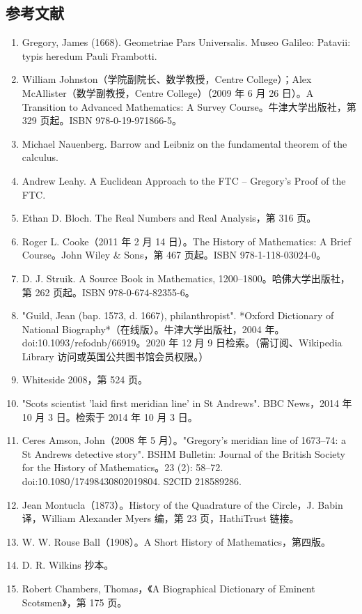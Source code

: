 \subsection{参考文献}
\begin{enumerate}
\item Gregory, James (1668). Geometriae Pars Universalis. Museo Galileo: Patavii: typis heredum Pauli Frambotti.
\item William Johnston（学院副院长、数学教授，Centre College）；Alex McAllister（数学副教授，Centre College）（2009 年 6 月 26 日）。A Transition to Advanced Mathematics: A Survey Course。牛津大学出版社，第 329 页起。ISBN 978-0-19-971866-5。
\item Michael Nauenberg. Barrow and Leibniz on the fundamental theorem of the calculus.
\item Andrew Leahy. A Euclidean Approach to the FTC – Gregory's Proof of the FTC.
\item Ethan D. Bloch. The Real Numbers and Real Analysis，第 316 页。
\item Roger L. Cooke（2011 年 2 月 14 日）。The History of Mathematics: A Brief Course。John Wiley & Sons，第 467 页起。ISBN 978-1-118-03024-0。
\item D. J. Struik. A Source Book in Mathematics, 1200–1800。哈佛大学出版社，第 262 页起。ISBN 978-0-674-82355-6。
\item "Guild, Jean (bap. 1573, d. 1667), philanthropist". *Oxford Dictionary of National Biography*（在线版）。牛津大学出版社，2004 年。doi:10.1093/ref\:odnb/66919。2020 年 12 月 9 日检索。（需订阅、Wikipedia Library 访问或英国公共图书馆会员权限。）
\item  Whiteside 2008，第 524 页。
\item "Scots scientist 'laid first meridian line' in St Andrews". BBC News，2014 年 10 月 3 日。检索于 2014 年 10 月 3 日。
\item Ceres Amson, John（2008 年 5 月）。"Gregory's meridian line of 1673–74: a St Andrews detective story". BSHM Bulletin: Journal of the British Society for the History of Mathematics。23 (2): 58–72. doi:10.1080/17498430802019804. S2CID 218589286.
\item Jean Montucla（1873）。History of the Quadrature of the Circle，J. Babin 译，William Alexander Myers 编，第 23 页，HathiTrust 链接。
\item W. W. Rouse Ball（1908）。A Short History of Mathematics，第四版。
\item D. R. Wilkins 抄本。
\item Robert Chambers, Thomas，《A Biographical Dictionary of Eminent Scotsmen》，第 175 页。

\end{enumerate}

